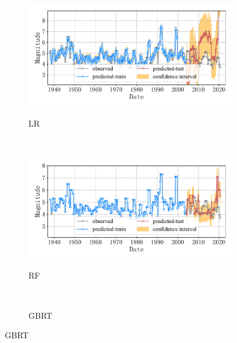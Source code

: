\begin{figure}[!htbp]
\begin{subfigure}[b]{0.45\textwidth}
    \caption{LR}
    \vspace{-0.2cm}
    \includegraphics[width=\textwidth]{Img/chap5_seism/block3/seism_lr_minyear_1932_maxyear_2021_spanlat_2_spanlon_4_timewindow_72_nextmonth_12_minmag_3.0_block_3.pdf}
    \vspace{-1cm}
    \label{fig:seism_lr_minyear_1932_maxyear_2021_spanlat_2_spanlon_4_timewindow_72_nextmonth_12_minmag_3.0_block_3}
  \end{subfigure}
  ~
  \begin{subfigure}[b]{0.45\textwidth}
    \caption{RF}
    \vspace{-0.2cm}
    \includegraphics[width=\textwidth]{Img/chap5_seism/block3/seism_rf_minyear_1932_maxyear_2021_spanlat_2_spanlon_4_timewindow_72_nextmonth_12_minmag_3.0_block_3.pdf}
    \vspace{-1cm}
    \label{fig:seism_rf_minyear_1932_maxyear_2021_spanlat_2_spanlon_4_timewindow_72_nextmonth_12_minmag_3.0_block_3}
  \end{subfigure}
  \\
  \begin{subfigure}[b]{0.45\textwidth}
    \caption{GBRT}
    \vspace{-0.2cm}

\end{subfigure}
\end{figure}
